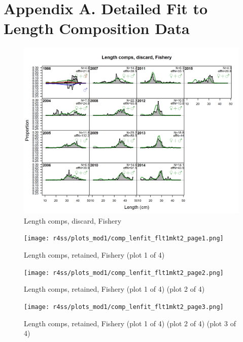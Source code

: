 \documentclass[12pt,]{article}
\begin{document}
\FloatBarrier

\newpage

\FloatBarrier
\newpage

\section{Appendix A. Detailed Fit to Length Composition
Data}\label{appendix-a.-detailed-fit-to-length-composition-data}

\begin{figure}
\centering
\includegraphics{r4ss/plots_mod1/comp_lenfit_flt1mkt1.png}
\caption{Length comps, discard, Fishery \label{fig:length_fits}}
\end{figure}

\begin{figure}
\centering
\texttt{[image: r4ss/plots\_mod1/comp\_lenfit\_flt1mkt2\_page1.png]}
\caption{Length comps, retained, Fishery (plot 1 of 4)
\label{fig:length_fits}}
\end{figure}

\begin{figure}
\centering
\texttt{[image: r4ss/plots\_mod1/comp\_lenfit\_flt1mkt2\_page2.png]}
\caption{Length comps, retained, Fishery (plot 1 of 4) (plot 2 of 4)
\label{fig:length_fits}}
\end{figure}

\begin{figure}
\centering
\texttt{[image: r4ss/plots\_mod1/comp\_lenfit\_flt1mkt2\_page3.png]}
\caption{Length comps, retained, Fishery (plot 1 of 4) (plot 2 of 4)
(plot 3 of 4) \label{fig:length_fits}}
\end{figure}
\end{document}
